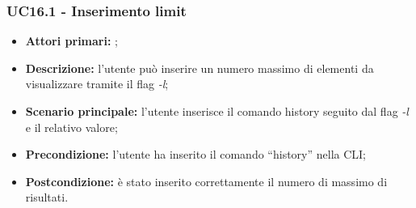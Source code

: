 \subsubsection{UC16.1 - Inserimento limit}
\begin{itemize}
	\item \textbf{Attori primari:} \us{};
	\item \textbf{Descrizione:} l’utente può inserire un numero massimo di elementi da visualizzare tramite il flag \textit{-l}; 
	\item \textbf{Scenario principale:} l’utente inserisce il comando history seguito dal flag \textit{-l} e il relativo valore;
	\item \textbf{Precondizione:} l’utente ha inserito il comando “history” nella CLI;
	\item \textbf{Postcondizione:} è stato inserito correttamente il numero di massimo di risultati.
\end{itemize}